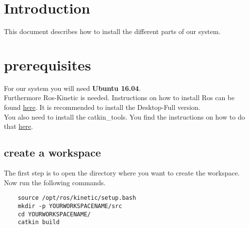 \documentclass[main.tex]{subfiles}
\begin{document}
	\section{Introduction}
	This document describes how to install the different parts of our system.
	
	\section{prerequisites}
	
	For our system you will need \textbf{Ubuntu 16.04}.\\
	Furthermore Ros-Kinetic is needed. Instructions on how to install Ros can be found \href{http://wiki.ros.org/kinetic/Installation/Ubuntu}{here}. It is recommended to install the Desktop-Full version.\\
	You also need to install the catkin\_tools. You find the instructions on how to do that \href{https://catkin-tools.readthedocs.io/en/latest/installing.html}{here}.\\
	\subsection{create a workspace}
	The first step is to open the directory where you want to create the workspace.\\
	Now run the following commands.
	\begin{lstlisting}
	source /opt/ros/kinetic/setup.bash
	mkdir -p YOURWORKSPACENAME/src
	cd YOURWORKSPACENAME/
	catkin build 
	\end{lstlisting}
	
\end{document}
